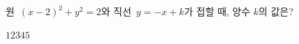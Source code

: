 원~$(x-2)^2+y^2=2$와 직선~$y=-x+k$가 접할 때, 양수 $k$의 값은?
\begin{choices32}{$1$}{$2$}{$3$}{$4$}{$5$}\end{choices32}
